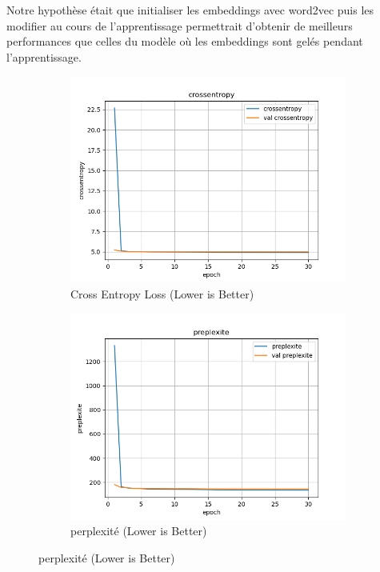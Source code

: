 \documentclass[a4paper]{article}
\begin{document}
Notre hypothèse était que initialiser les embeddings avec word2vec puis les modifier au cours de l'apprentissage permettrait d'obtenir de meilleurs performances que celles du modèle où les embeddings sont gelés pendant l'apprentissage. 


\begin{figure}[ht]
  \centering
  \begin{subfigure}{0.47\textwidth}
    \includegraphics[width=\linewidth]{../logs/learnfromword2vect_0/crossentropy.png}
    \caption{Cross Entropy Loss (Lower is Better)}
  \end{subfigure}
  \hfill
  \begin{subfigure}{0.47\textwidth}
    \includegraphics[width=\linewidth]{../logs/learnfromword2vect_0/preplexite.png}
    \caption{perplexité (Lower is Better)}
  \end{subfigure}


\end{figure}
\end{document}
